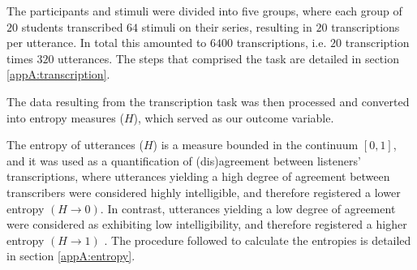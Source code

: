 The participants and stimuli were divided into five groups, where each group of $20$ students transcribed $64$ stimuli on their series, resulting in $20$ transcriptions per utterance. In total this amounted to $6400$ transcriptions, i.e. $20$ transcription times $320$ utterances. The steps that comprised the task are detailed in section \ref{appA:transcription}. 

The data resulting from the transcription task was then processed and converted into entropy measures ($H$), which served as our outcome variable. 

The entropy of utterances ($H$) is a measure bounded in the continuum $[0,1]$, and it was used as a quantification of (dis)agreement between listeners' transcriptions, where utterances yielding a high degree of agreement between transcribers were considered highly intelligible, and therefore registered a lower entropy $\left( H \rightarrow 0 \right)$. In contrast, utterances yielding a low degree of agreement were considered as exhibiting low intelligibility, and therefore registered a higher entropy $\left( H \rightarrow 1 \right)$ \citep{Boonen_et_al_2021, Faes_et_al_2021}. The procedure followed to calculate the entropies is detailed in section \ref{appA:entropy}.
%
%
